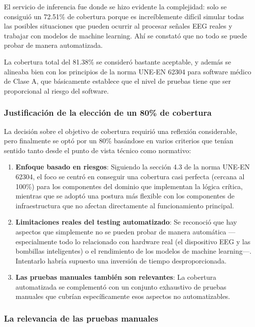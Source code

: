 El servicio de inferencia fue donde se hizo evidente la complejidad: solo se consiguió un 72.51\% de cobertura porque es increíblemente difícil simular todas las posibles situaciones que pueden ocurrir al procesar señales EEG reales y trabajar con modelos de machine learning. Ahí se constató que no todo se puede probar de manera automatizada.

La cobertura total del 81.38\% se consideró bastante aceptable, y además se alineaba bien con los principios de la norma UNE-EN 62304 para software médico de Clase A, que básicamente establece que el nivel de pruebas tiene que ser proporcional al riesgo del software.

\subsubsection{Justificación de la elección de un 80\% de cobertura}

La decisión sobre el objetivo de cobertura requirió una reflexión considerable, pero finalmente se optó por un 80\% basándose en varios criterios que tenían sentido tanto desde el punto de vista técnico como normativo:

\begin{enumerate}
    \item \textbf{Enfoque basado en riesgos}: Siguiendo la sección 4.3 de la norma UNE-EN 62304, el foco se centró en conseguir una cobertura casi perfecta (cercana al 100\%) para los componentes del dominio que implementan la lógica crítica, mientras que se adoptó una postura más flexible con los componentes de infraestructura que no afectan directamente al funcionamiento principal.
    
    \item \textbf{Limitaciones reales del testing automatizado}: Se reconoció que hay aspectos que simplemente no se pueden probar de manera automática —especialmente todo lo relacionado con hardware real (el dispositivo EEG y las bombillas inteligentes) o el rendimiento de los modelos de machine learning—. Intentarlo habría supuesto una inversión de tiempo desproporcionada.
    
    \item \textbf{Las pruebas manuales también son relevantes}: La cobertura automatizada se complementó con un conjunto exhaustivo de pruebas manuales que cubrían específicamente esos aspectos no automatizables.
\end{enumerate}

\subsubsection{La relevancia de las pruebas manuales}

